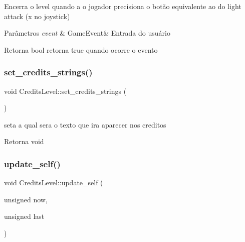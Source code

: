 Encerra o level quando a o jogador precisiona o botão equivalente ao do light attack (x no joystick) 


\begin{DoxyParams}{Parâmetros}
{\em event} & Game\+Event\& Entrada do usuário \\
\hline
\end{DoxyParams}
\begin{DoxyReturn}{Retorna}
bool retorna true quando ocorre o evento 
\end{DoxyReturn}
\mbox{\label{classCreditsLevel_a627849460d0ed66cfdc491fbdd313388}} 
\subsubsection{\texorpdfstring{set\+\_\+credits\+\_\+strings()}{set\_credits\_strings()}}
{\footnotesize\ttfamily void Credits\+Level\+::set\+\_\+credits\+\_\+strings (\begin{DoxyParamCaption}{ }\end{DoxyParamCaption})\hspace{0.3cm}{\ttfamily [protected]}}



seta a qual sera o texto que ira aparecer nos creditos 

\begin{DoxyReturn}{Retorna}
void 
\end{DoxyReturn}
\mbox{\label{classCreditsLevel_a2df0795f16916cab12337010ee18f46c}} 
\subsubsection{\texorpdfstring{update\+\_\+self()}{update\_self()}}
{\footnotesize\ttfamily void Credits\+Level\+::update\+\_\+self (\begin{DoxyParamCaption}\item[{unsigned}]{now,  }\item[{unsigned}]{last }\end{DoxyParamCaption})\hspace{0.3cm}{\ttfamily [protected]}}



